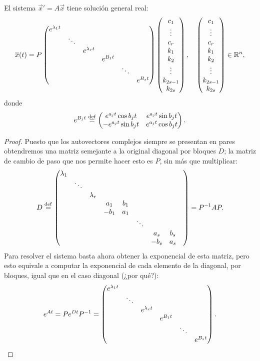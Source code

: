\documentclass[../ecuaciones_diferenciales.tex]{subfiles}
\begin{document}
\begin{theorem}
	El sistema \(\vec{x}' = A\vec{x}\) tiene solución general real:
	\[\overline{x}(t) = P
		\begin{pmatrix}e^{\lambda_1 t} & & & & & \\
			& \ddots & & & & \\
			& & e^{\lambda_r t} & & & \\
			& & & e^{B_1 t} & & \\
			& & & & \ddots & \\
			& & & & & e^{B_s t}\end{pmatrix}
		\begin{pmatrix}c_1 \\ \vdots \\ c_r \\ k_1 \\ k_2 \\ \vdots \\ k_{2s-1}\\ k_{2s}\end{pmatrix},
		\quad 
		\begin{pmatrix}c_1 \\ \vdots \\ c_r \\ k_1 \\ k_2 \\ \vdots \\ k_{2s-1}\\ k_{2s}\end{pmatrix}
		\in \mathbb{R}^n,\]
	donde
	\[e^{B_j t} \overset{\operatorname{def}}{=} \begin{pmatrix}e^{a_j t} \cos b_j t & e^{a_j t} \sin b_j t \\
		-e^{a_j t} \sin b_j t & e^{a_j t} \cos b_j t\end{pmatrix}.\]
\end{theorem}

\begin{proof}
	Puesto que los autovectores complejos siempre se presentan en
	pares obtendremos una matriz semejante a la original diagonal por bloques
	\(D\); la matriz de cambio de paso que nos permite hacer esto es \(P\), 
	sin más que multiplicar:
	\[D \overset{\operatorname{def}}{=} \begin{pmatrix}\lambda_1 & & & & & & & \\
		& \ddots & & & & & & \\
		& & \lambda_r & & & & & \\
		& & & a_1 & b_1 & & & & \\
		& & & -b_1 & a_1 & & & & \\
		& & & & & \ddots & & \\
		& & & & & & a_s & b_s \\
		& & & & & & -b_s & a_s\end{pmatrix} = P^{-1}AP.\]
	Para resolver el sistema basta ahora obtener la exponencial de esta matriz,
	pero esto equivale a computar la exponencial de cada elemento de la diagonal,
	por bloques, igual que en el caso diagonal (¿por qué?):
	\[e^{A t} = P e^{D t} P^{-1} =
		\begin{pmatrix}e^{\lambda_1 t} & & & & & \\
			& \ddots & & & & \\
			& & e^{\lambda_r t} & & & \\
			& & & e^{B_1 t} & & \\
			& & & & \ddots & \\
			& & & & & e^{B_s t}\end{pmatrix}.\]
\end{proof}
\end{document}

